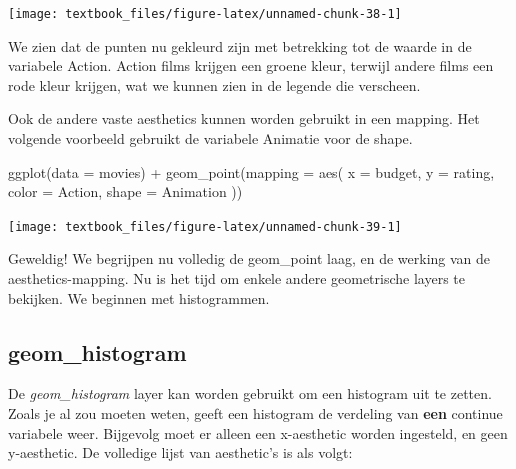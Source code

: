 \documentclass[]{tufte-book}
\newenvironment{Shaded}{}{}
\newcommand{\AttributeTok}[1]{\textcolor[rgb]{0.49,0.56,0.16}{#1}}
\newcommand{\FunctionTok}[1]{\textcolor[rgb]{0.02,0.16,0.49}{#1}}
\newcommand{\NormalTok}[1]{#1}
\newcommand{\SpecialCharTok}[1]{\textcolor[rgb]{0.25,0.44,0.63}{#1}}
\begin{document}
\texttt{[image: textbook\_files/figure-latex/unnamed-chunk-38-1]}

We zien dat de punten nu gekleurd zijn met betrekking tot de waarde in de variabele Action. Action films krijgen een groene kleur, terwijl andere films een rode kleur krijgen, wat we kunnen zien in de legende die verscheen.

Ook de andere vaste aesthetics kunnen worden gebruikt in een mapping. Het volgende voorbeeld gebruikt de variabele Animatie voor de shape.

\begin{Shaded}
\begin{Highlighting}[]
\FunctionTok{ggplot}\NormalTok{(}\AttributeTok{data =}\NormalTok{ movies) }\SpecialCharTok{+}
  \FunctionTok{geom\_point}\NormalTok{(}\AttributeTok{mapping =} \FunctionTok{aes}\NormalTok{(}
    \AttributeTok{x =}\NormalTok{ budget,}
    \AttributeTok{y =}\NormalTok{ rating,}
    \AttributeTok{color =}\NormalTok{ Action,}
    \AttributeTok{shape =}\NormalTok{ Animation}
\NormalTok{  ))}
\end{Highlighting}
\end{Shaded}

\texttt{[image: textbook\_files/figure-latex/unnamed-chunk-39-1]}

Geweldig! We begrijpen nu volledig de geom\_point laag, en de werking van de aesthetics-mapping. Nu is het tijd om enkele andere geometrische layers te bekijken. We beginnen met histogrammen.

\hypertarget{geom_histogram}{%
\subsection{geom\_histogram}\label{geom_histogram}}

De \emph{geom\_histogram} layer kan worden gebruikt om een histogram uit te zetten. Zoals je al zou moeten weten, geeft een histogram de verdeling van \textbf{een} continue variabele weer. Bijgevolg moet er alleen een x-aesthetic worden ingesteld, en geen y-aesthetic. De volledige lijst van aesthetic's is als volgt:
\end{document}
